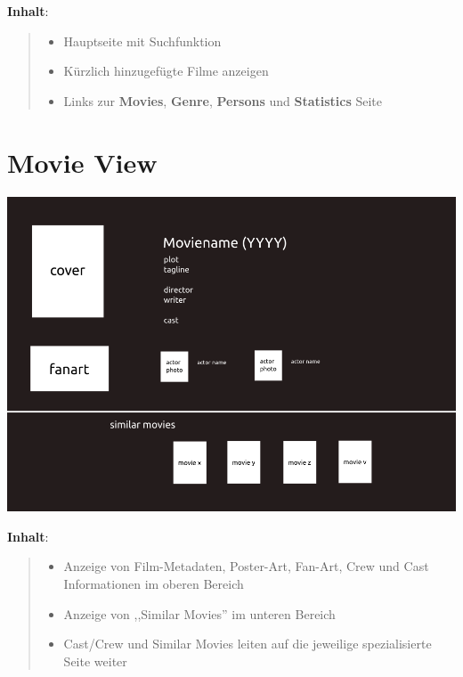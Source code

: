\documentclass[a4paper]{article}
\begin{document}
\textbf{Inhalt}:
%
\begin{quote}
%
\begin{itemize}

\item Hauptseite mit Suchfunktion

\item Kürzlich hinzugefügte Filme anzeigen

\item Links zur \textbf{Movies}, \textbf{Genre}, \textbf{Persons} und \textbf{Statistics} Seite

\end{itemize}

\end{quote}


\section{Movie View%
  \label{movie-view}%
}

\includegraphics{./movieview.png}

\textbf{Inhalt}:
%
\begin{quote}
%
\begin{itemize}

\item Anzeige von Film-Metadaten, Poster-Art, Fan-Art, Crew und Cast Informationen im
oberen Bereich

\item Anzeige von ,,Similar Movies'' im unteren Bereich

\item Cast/Crew und Similar Movies leiten auf die jeweilige spezialisierte Seite
weiter

\end{itemize}

\end{quote}
\end{document}
